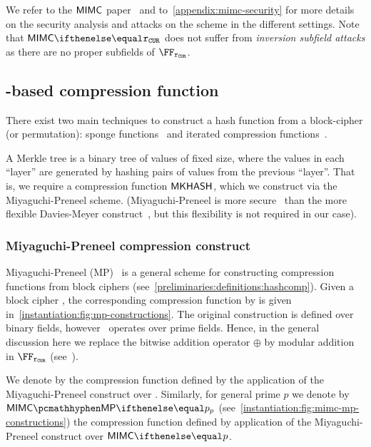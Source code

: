 We refer to the $\mathsf{MIMC{}}$ paper~\cite[Section 4.2 and 5.1]{albrecht2016mimc} and to~\cref{appendix:mimc-security} for more details on the security analysis and attacks on the scheme in the different settings. Note that $\mimcPrime{\rCURVE}$ does not suffer from \emph{inversion subfield attacks} as there are no proper subfields of $\FFx{\rCURVE}$.

\subsection{\mimc{}-based compression function}\label{instantiation:mkhash:mimc-compressionf}

There exist two main techniques to construct a hash function from a block-cipher (or permutation): sponge functions~\cite{bertoni2007sponge} and iterated compression functions~\cite{black2002black}.

A Merkle tree is a binary tree of values of fixed size, where the values in each ``layer'' are generated by hashing pairs of values from the previous ``layer''. That is, we require a compression function $\mathsf{MKHASH}$, which we construct via the Miyaguchi-Preneel scheme. (Miyaguchi-Preneel is more secure~\cite[$f_5$ function]{black2002black} than the more flexible Davies-Meyer construct~\cite[Section 3]{gazzoni2006maelstrom}, but this flexibility is not required in our case).

\subsubsection{Miyaguchi-Preneel compression construct}

Miyaguchi-Preneel (MP)~\cite[$f_3$ function]{black2002black} is a general scheme for constructing compression functions from block ciphers (see~\cref{preliminaries:definitions:hashcomp}). Given a block cipher \Enc, the corresponding compression function by \fMP{} is given in~\cref{instantiation:fig:mp-constructions}. The original construction is defined over binary fields, however \zeth~operates over prime fields. Hence, in the general discussion here we replace the bitwise addition operator $\oplus$ by modular addition in $\FFx{\rCURVE}$ (see~\cite{mp-security-ethsnarks}).

We denote by \mimcMP{} the compression function defined by the application of the Miyaguchi-Preneel construct over \mimc{}. Similarly, for general prime $p$ we denote by $\mimcMPPrime{p}$ (see~\cref{instantiation:fig:mimc-mp-constructions}) the compression function defined by application of the Miyaguchi-Preneel construct over $\mimcPrime{p}$.

